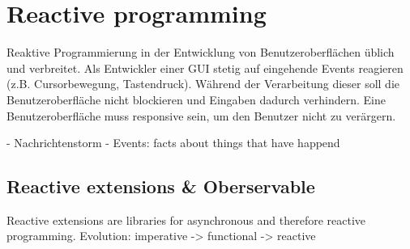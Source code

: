 \section{Reactive programming}
Reaktive Programmierung in der Entwicklung von Benutzeroberflächen üblich und verbreitet. Als Entwickler einer GUI stetig auf eingehende Events reagieren (z.B. Cursorbewegung, Tastendruck). Während der Verarbeitung dieser soll die Benutzeroberfläche nicht blockieren und Eingaben dadurch verhindern. Eine Benutzeroberfläche muss responsive sein, um den Benutzer nicht zu verärgern.

- Nachrichtenstorm
- Events: facts about things that have happend

\subsection{Reactive extensions \& Oberservable}
Reactive extensions are libraries for asynchronous and therefore reactive programming.
Evolution: imperative -> functional -> reactive
